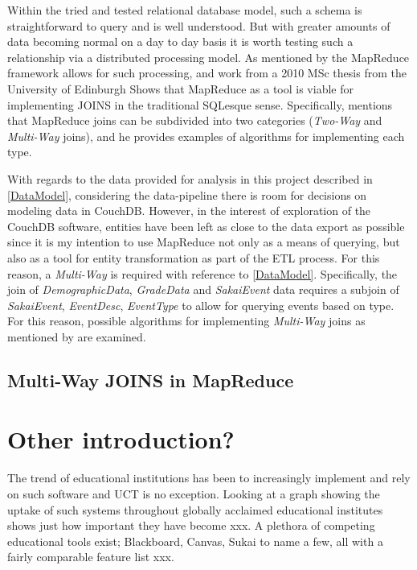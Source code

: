 Within the tried and tested relational database model, such a schema is straightforward to query and is well understood. But with greater amounts of data becoming normal on a day to day basis it is worth testing such a relationship via a distributed processing model. As mentioned by \cite{mining2011} the MapReduce framework allows for such processing, and work from a 2010 MSc thesis from the University of Edinburgh \cite{chandar2010} Shows that MapReduce as a tool is viable for implementing JOINS in the traditional SQLesque sense. Specifically, \cite{chandar2010} mentions that MapReduce joins can be subdivided into two categories (\textit{Two-Way} and \textit{Multi-Way} joins), and he provides examples of algorithms for implementing each type.

With regards to the data provided for analysis in this project described in \ref{DataModel}, considering the data-pipeline there is room for decisions on modeling data in CouchDB. However, in the interest of exploration of the CouchDB software, entities have been left as close to the data export as possible since it is my intention to use MapReduce not only as a means of querying, but also as a tool for entity transformation as part of the ETL process. For this reason, a \textit{Multi-Way} is required with reference to \ref{DataModel}. Specifically, the join of \textit{DemographicData}, \textit{GradeData} and \textit{SakaiEvent} data requires a subjoin of \textit{SakaiEvent}, \textit{EventDesc}, \textit{EventType} to allow for querying events based on type. For this reason, possible algorithms for implementing \textit{Multi-Way} joins as mentioned by \cite{chandar2010} are examined.

\subsection{Multi-Way JOINS in MapReduce}

\section{Other introduction?}

The trend of educational institutions has been to increasingly implement and rely on such software and UCT is no exception. Looking at a graph showing the uptake of such systems throughout globally acclaimed educational institutes shows just how important they have become xxx. A plethora of competing educational tools exist; Blackboard, Canvas, Sukai to name a few, all with a fairly comparable feature list xxx.


